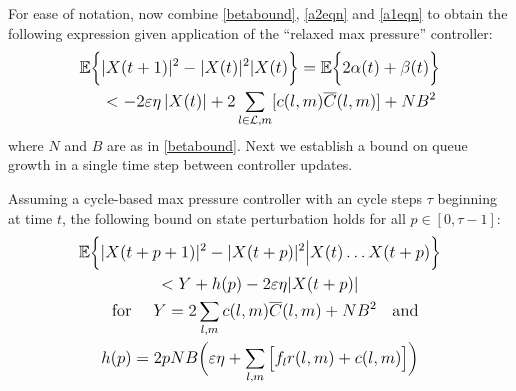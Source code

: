 For ease of notation, now combine \eqref{betabound}, \eqref{a2eqn} and \eqref{a1eqn} to obtain the following expression given application of the  ``relaxed max pressure'' controller:
\begin{align}
\expectation{&|X(t+1)|^{2} - |X(t)|^{2}  |   X(t)} = \expectation{2\alpha(t) + \beta(t)} \nonumber \\
&<  -2\varepsilon \eta \left| X(t ) \right| + 2 \sum_{l \in \linkset,m} [c(l,m)\overline{C} (l,m) ]+ NB^{2}
\end{align}
where $N$ and $B$ are as in \eqref{betabound}. Next we establish a bound on queue growth in a single time step between controller updates. 
\begin{Lem} \label{lemma_p} 
Assuming a cycle-based max pressure controller with an cycle steps $\tau$ beginning at time $t$, the following bound on state perturbation holds for all 
$p \in [0, \tau - 1]$:
\begin{gather} \nonumber
\expectation{\vert X(t + p + 1)\vert^2 - \vert X(t + p)\vert^2 \big| X(t) \ldots X(t + p )} \\ 
<  Y + h(p) - 2\varepsilon \eta \vert X(t + p )\vert   \label{boundCycleMP} \\ %
\text{ \normalsize{ for }\quad} Y = 2 \sum_{l,m} c(l,m)\overline{C}(l,m) + N B^2  \text{ \; \normalsize{and}} \\
h(p) =  2 pNB\Big(\varepsilon\eta +  \sum_{l,m}\big[f_{l}r(l,m) + c(l,m)\big]\Big)  
\end{gather}\end{Lem}
